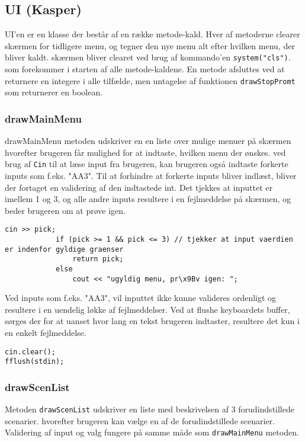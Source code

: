 \subsection{UI (Kasper)}

UI'en er en klasse der består af en række metode-kald. Hver af metoderne clearer skærmen for tidligere menu, og tegner den nye menu alt efter hvilken menu, der bliver kaldt. skærmen bliver clearet ved brug af kommando'en \texttt{system("cls")}. som forekommer i starten af alle metode-kaldene. En metode afsluttes ved at returnere en integere i alle tilfælde, men untagelse af funktionen \texttt{drawStopPromt} som returnerer en boolean.

\subsubsection{drawMainMenu}
drawMainMenu metoden udskriver en en liste over mulige menuer på skærmen hvorefter brugeren får mulighed for at indtaste, hvilken menu der ønskes. ved brug af \texttt{Cin} til at læse input fra brugeren, kan brugeren også indtaste forkerte inputs som f.eks. "AA3". Til at forhindre at forkerte inputs bliver indlæst, bliver der fortaget en validering af den indtastede int. Det tjekkes at inputtet er imellem 1 og 3, og alle andre inputs resultere i en fejlmeddelse på skærmen, og beder brugeren om at prøve igen.
\begin{lstlisting}
cin >> pick;
			if (pick >= 1 && pick <= 3) // tjekker at input vaerdien er indenfor gyldige graenser
				return pick;
			else
				cout << "ugyldig menu, pr\x9Bv igen: ";
\end{lstlisting}


Ved inputs som f.eks. "AA3", vil inputtet ikke kunne valideres ordenligt og resultere i en uendelig løkke af fejlmeddelser. Ved at flushe keyboardets buffer, sørges der for at uanset hvor lang en tekst brugeren indtaster, resultere det kun i en enkelt fejlmeddelse.
\begin{lstlisting}
cin.clear();
fflush(stdin);
\end{lstlisting}

\subsubsection{drawScenList}
Metoden \texttt{drawScenList} udskriver en liste med beskrivelsen af 3 forudindstillede scenarier. hvorefter brugeren kan vælge en af de forudindstillede scenarier. Validering af input og valg fungere på samme måde som \texttt{drawMainMenu} metoden.

